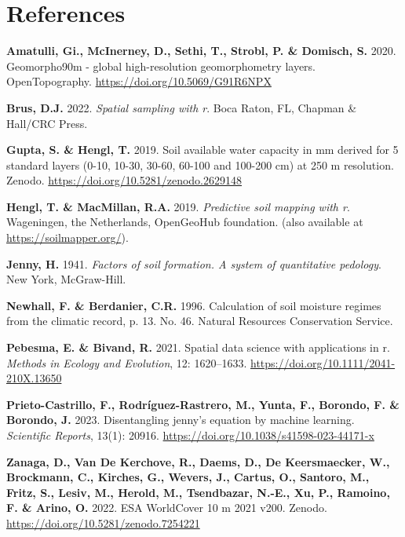 \documentclass[
  10pt,
  b5paper,
  oneside]{book}
\newlength{\cslhangindent}
\newenvironment{CSLReferences}[2] %
 {\begin{list}{}{%
  \setlength{\itemindent}{0pt}
  \setlength{\leftmargin}{0pt}
  \setlength{\parsep}{0pt}
  \ifodd #1
   \setlength{\leftmargin}{\cslhangindent}
   \setlength{\itemindent}{-1\cslhangindent}
  \fi
  \setlength{\itemsep}{#2\baselineskip}}}
 {\end{list}}
\begin{document}
\chapter*{References}\label{references}

\label{refs}
\begin{CSLReferences}{0}{0}
\textbf{Amatulli, Gi., McInerney, D., Sethi, T., Strobl, P. \& Domisch, S.} 2020. Geomorpho90m - global high-resolution geomorphometry layers. OpenTopography. \url{https://doi.org/10.5069/G91R6NPX}

\textbf{Brus, D.J.} 2022. \emph{Spatial sampling with r}. Boca Raton, FL, Chapman \& Hall/CRC Press.

\textbf{Gupta, S. \& Hengl, T.} 2019. Soil available water capacity in mm derived for 5 standard layers (0-10, 10-30, 30-60, 60-100 and 100-200 cm) at 250 m resolution. Zenodo. \url{https://doi.org/10.5281/zenodo.2629148}

\textbf{Hengl, T. \& MacMillan, R.A.} 2019. \emph{Predictive soil mapping with r}. Wageningen, the Netherlands, OpenGeoHub foundation. (also available at \url{https://soilmapper.org/}).

\textbf{Jenny, H.} 1941. \emph{Factors of soil formation. A system of quantitative pedology}. New York, McGraw-Hill.

\textbf{Newhall, F. \& Berdanier, C.R.} 1996. Calculation of soil moisture regimes from the climatic record, p. 13. No. 46. Natural Resources Conservation Service.

\textbf{Pebesma, E. \& Bivand, R.} 2021. Spatial data science with applications in r. \emph{Methods in Ecology and Evolution}, 12: 1620--1633. \url{https://doi.org/10.1111/2041-210X.13650}

\textbf{Prieto-Castrillo, F., Rodríguez-Rastrero, M., Yunta, F., Borondo, F. \& Borondo, J.} 2023. Disentangling jenny's equation by machine learning. \emph{Scientific Reports}, 13(1): 20916. \url{https://doi.org/10.1038/s41598-023-44171-x}

\textbf{Zanaga, D., Van De Kerchove, R., Daems, D., De Keersmaecker, W., Brockmann, C., Kirches, G., Wevers, J., Cartus, O., Santoro, M., Fritz, S., Lesiv, M., Herold, M., Tsendbazar, N.-E., Xu, P., Ramoino, F. \& Arino, O.} 2022. ESA WorldCover 10 m 2021 v200. Zenodo. \url{https://doi.org/10.5281/zenodo.7254221}

\end{CSLReferences}


\end{document}

